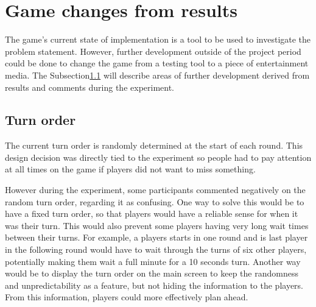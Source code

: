 \section{Game changes from results}\label{sec:changes_from_results}
The game's current state of implementation is a tool to be used to investigate the problem statement. However, further development outside of the project period could be done to change the game from a testing tool to a piece of entertainment media. The Subsection\ref{sub:turn_order} will describe areas of further development derived from results and comments during the experiment.

\subsection{Turn order}\label{sub:turn_order}
The current turn order is randomly determined at the start of each round. This design decision was directly tied to the experiment so people had to pay attention at all times on the game if players did not want to miss something.

However during the experiment, some participants commented negatively on the random turn order, regarding it as confusing. One way to solve this would be to have a fixed turn order, so that players would have a reliable sense for when it was their turn. This would also prevent some players having very long wait times between their turns. For example, a players starts in one round and is last player in the following round would have to wait through the turns of six other players, potentially making them wait a full minute for a 10 seconds turn. Another way would be to display the turn order on the main screen to keep the randomness and unpredictability as a feature, but not hiding the information to the players. From this information, players could more effectively plan ahead.